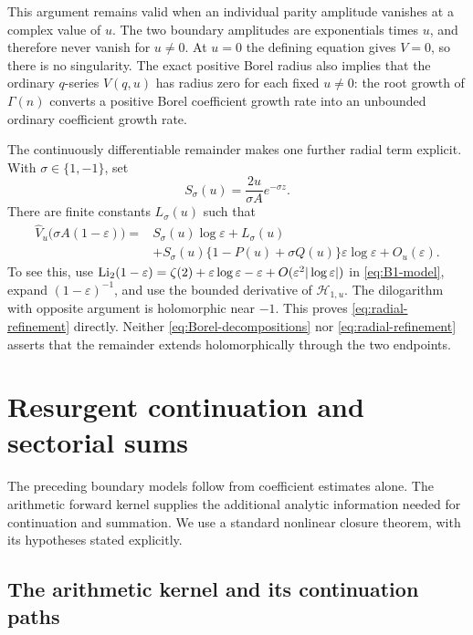 This argument remains valid when an individual parity amplitude vanishes
at a complex value of $u$. The two boundary amplitudes are exponentials
times $u$, and therefore never vanish for $u\ne0$. At $u=0$ the defining
equation gives $V=0$, so there is no singularity.
The exact positive Borel radius also implies that the ordinary
$q$-series $V(q,u)$ has radius zero for each fixed $u\ne0$:
the root growth of $\Gamma(n)$ converts a positive Borel coefficient
growth rate into an unbounded ordinary coefficient growth rate.

The continuously differentiable remainder makes one further radial term
explicit. With $\sigma\in\{1,-1\}$, set
\[
 S_\sigma(u)=\frac{2u}{\sigma A}e^{-\sigma z}.
\]
There are finite constants $L_\sigma(u)$ such that
\begin{equation}\label{eq:radial-refinement}
\begin{split}
 \widehat V_u\bigl(\sigma A(1-\varepsilon)\bigr)
 ={}&S_\sigma(u)\log\varepsilon+L_\sigma(u)\\
 &+S_\sigma(u)\{1-P(u)+\sigma Q(u)\}
                   \varepsilon\log\varepsilon+O_u(\varepsilon).
\end{split}
\end{equation}
To see this, use
$\operatorname{Li}_2(1-\varepsilon)=\zeta(2)+\varepsilon\log\varepsilon
-\varepsilon+O(\varepsilon^2|\log\varepsilon|)$ in
\eqref{eq:B1-model}, expand $(1-\varepsilon)^{-1}$, and use the bounded
derivative of $\mathcal H_{1,u}$. The dilogarithm with opposite argument
is holomorphic near $-1$. This proves \eqref{eq:radial-refinement} directly.
Neither \eqref{eq:Borel-decompositions} nor
\eqref{eq:radial-refinement} asserts that the remainder extends
holomorphically through the two endpoints.

\section{Resurgent continuation and sectorial sums}
\label{sec:continuation}

The preceding boundary models follow from coefficient estimates alone.
The arithmetic forward kernel supplies the additional analytic information
needed for continuation and summation. We use a standard nonlinear
closure theorem, with its hypotheses stated explicitly.

\subsection{The arithmetic kernel and its continuation paths}

